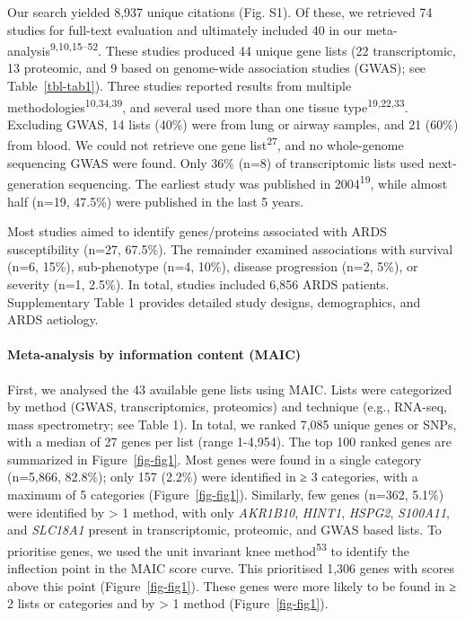 \documentclass[
  11,
  a4paper,
]{article}
\let\oldparagraph\paragraph
\renewcommand{\paragraph}[1]{\oldparagraph{#1}\mbox{}}
\begin{document}
Our search yielded 8,937 unique citations (Fig. S1). Of these, we
retrieved 74 studies for full-text evaluation and ultimately included 40
in our meta-analysis\textsuperscript{9,10,15--52}. These studies
produced 44 unique gene lists (22 transcriptomic, 13 proteomic, and 9
based on genome-wide association studies (GWAS); see
Table~\ref{tbl-tab1}). Three studies reported results from multiple
methodologies\textsuperscript{10,34,39}, and several used more than one
tissue type\textsuperscript{19,22,33}. Excluding GWAS, 14 lists (40\%)
were from lung or airway samples, and 21 (60\%) from blood. We could not
retrieve one gene list\textsuperscript{27}, and no whole-genome
sequencing GWAS were found. Only 36\% (n=8) of transcriptomic lists used
next-generation sequencing. The earliest study was published in
2004\textsuperscript{19}, while almost half (n=19, 47.5\%) were
published in the last 5 years.

Most studies aimed to identify genes/proteins associated with ARDS
susceptibility (n=27, 67.5\%). The remainder examined associations with
survival (n=6, 15\%), sub-phenotype (n=4, 10\%), disease progression
(n=2, 5\%), or severity (n=1, 2.5\%). In total, studies included 6,856
ARDS patients. Supplementary Table 1 provides detailed study designs,
demographics, and ARDS aetiology.

\hypertarget{meta-analysis-by-information-content-maic}{%
\paragraph{Meta-analysis by information content
(MAIC)}\label{meta-analysis-by-information-content-maic}}

First, we analysed the 43 available gene lists using MAIC. Lists were
categorized by method (GWAS, transcriptomics, proteomics) and technique
(e.g., RNA-seq, mass spectrometry; see Table 1). In total, we ranked
7,085 unique genes or SNPs, with a median of 27 genes per list (range
1-4,954). The top 100 ranked genes are summarized in
Figure~\ref{fig-fig1}. Most genes were found in a single category
(n=5,866, 82.8\%); only 157 (2.2\%) were identified in ≥ 3 categories,
with a maximum of 5 categories (Figure~\ref{fig-fig1}). Similarly, few
genes (n=362, 5.1\%) were identified by \textgreater{} 1 method, with
only \emph{AKR1B10}, \emph{HINT1}, \emph{HSPG2}, \emph{S100A11}, and
\emph{SLC18A1} present in transcriptomic, proteomic, and GWAS based
lists. To prioritise genes, we used the unit invariant knee
method\textsuperscript{53} to identify the inflection point in the MAIC
score curve. This prioritised 1,306 genes with scores above this point
(Figure~\ref{fig-fig1}). These genes were more likely to be found in ≥ 2
lists or categories and by \textgreater{} 1 method
(Figure~\ref{fig-fig1}).
\end{document}
